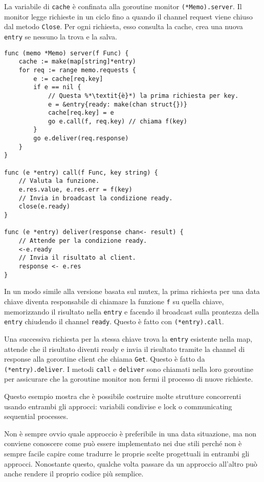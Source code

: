 \documentclass[../../thesis.tex]{subfiles}
\begin{document}
    La variabile di \verb"cache" è confinata alla goroutine monitor \verb"(*Memo).server".
    Il monitor legge richieste in un ciclo fino a quando il channel request viene chiuso dal metodo \verb"Close".
    Per ogni richiesta, esso consulta la cache, crea una nuova \verb"entry" se nessuno la trova e la salva.
    \begin{lstlisting}[frame = single,label={lst:lstlisting9-7.9}]
func (memo *Memo) server(f Func) {
    cache := make(map[string]*entry)
    for req := range memo.requests {
        e := cache[req.key]
        if e == nil {
            // Questa %*\textit{è}*) la prima richiesta per key.
            e = &entry{ready: make(chan struct{})}
            cache[req.key] = e
            go e.call(f, req.key) // chiama f(key)
        }
        go e.deliver(req.response)
    }
}

func (e *entry) call(f Func, key string) {
    // Valuta la funzione.
    e.res.value, e.res.err = f(key)
    // Invia in broadcast la condizione ready.
    close(e.ready)
}

func (e *entry) deliver(response chan<- result) {
    // Attende per la condizione ready.
    <-e.ready
    // Invia il risultato al client.
    response <- e.res
}
    \end{lstlisting}
    In un modo simile alla versione basata sul mutex, la prima richiesta per una data chiave diventa responsabile di chiamare la funzione \verb"f" su quella chiave, memorizzando il risultato nella \verb"entry" e facendo il broadcast sulla prontezza della \verb"entry" chiudendo il channel \verb"ready".
    Questo è fatto con \verb"(*entry).call".
    \hfill \vspace{12pt}

    Una successiva richiesta per la stessa chiave trova la \verb"entry" esistente nella map, attende che il risultato diventi ready e invia il risultato tramite la channel di response alla goroutine client che chiama \verb"Get".
    Questo è fatto da \verb"(*entry).deliver".
    I metodi \verb"call" e \verb"deliver" sono chiamati nella loro goroutine per assicurare che la goroutine monitor non fermi il processo di nuove richieste.
    \hfill \vspace{12pt}

    Questo esempio mostra che è possibile costruire molte strutture concorrenti usando entrambi gli approcci: variabili condivise e lock o communicating sequential processes.
    \hfill \vspace{12pt}

    Non è sempre ovvio quale approccio è preferibile in una data situazione, ma non conviene conoscere come può essere implementato nei due stili perché non è sempre facile capire come tradurre le proprie scelte progettuali in entrambi gli approcci.
    Nonostante questo, qualche volta passare da un approccio all'altro può anche rendere il proprio codice più semplice.
\end{document}
